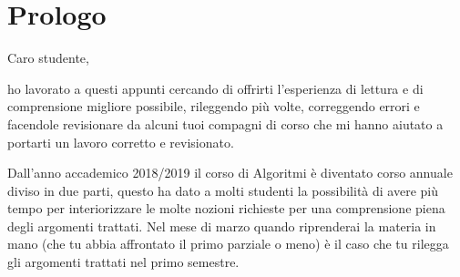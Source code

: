 \chapter*{Prologo}

Caro studente,

ho lavorato a questi appunti cercando di offrirti l'esperienza di lettura e di comprensione migliore possibile, rileggendo più volte, correggendo errori e facendole revisionare da alcuni tuoi compagni di corso che mi hanno aiutato a portarti un lavoro corretto e revisionato.



Dall'anno accademico 2018/2019 il corso di Algoritmi è diventato corso annuale diviso in due parti, questo ha dato a molti studenti la possibilità di avere più tempo per interiorizzare le molte nozioni richieste per una comprensione piena degli argomenti trattati.
Nel mese di marzo quando riprenderai la materia in mano (che tu abbia affrontato il primo parziale o meno) è il caso che tu rilegga gli argomenti trattati nel primo semestre.

